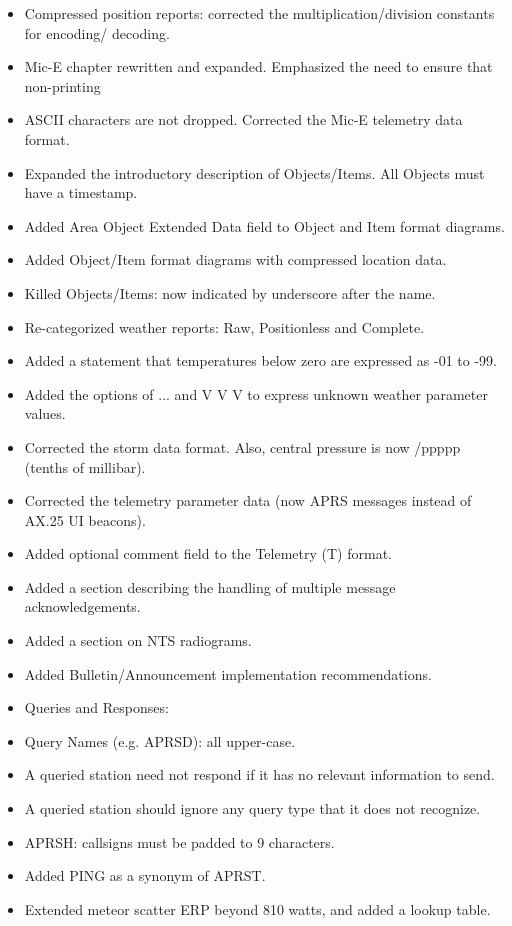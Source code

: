 \begin{itemize}
\begin{itemize}
\item Compressed position reports: corrected the multiplication/division constants for encoding/
decoding.
\item Mic-E chapter rewritten and expanded. Emphasized the need to ensure that non-printing
\item ASCII characters are not dropped. Corrected the Mic-E telemetry data format.
\item Expanded the introductory description of Objects/Items. All Objects must have a timestamp.
\item Added Area Object Extended Data field to Object and Item format diagrams.
\item Added Object/Item format diagrams with compressed location data.
\item Killed Objects/Items: now indicated by underscore after the name.
\item Re-categorized weather reports: Raw, Positionless and Complete.
\item Added a statement that temperatures below zero are expressed as -01 to -99.
\item Added the options of ... and V V V to express unknown weather parameter values.
\item Corrected the storm data format. Also, central pressure is now /ppppp (tenths of millibar).
\item Corrected the telemetry parameter data (now APRS messages instead of AX.25 UI beacons).
\item Added optional comment field to the Telemetry (T) format.
\item Added a section describing the handling of multiple message acknowledgements.
\item Added a section on NTS radiograms.
\item Added Bulletin/Announcement implementation recommendations.
\item Queries and Responses:
\item Query Names (e.g. APRSD): all upper-case.
\item A queried station need not respond if it has no relevant information to send.
\item A queried station should ignore any query type that it does not recognize.
\item APRSH: callsigns must be padded to 9 characters.
\item Added PING as a synonym of APRST.
\item Extended meteor scatter ERP beyond 810 watts, and added a lookup table.

\end{itemize}
\end{itemize}
